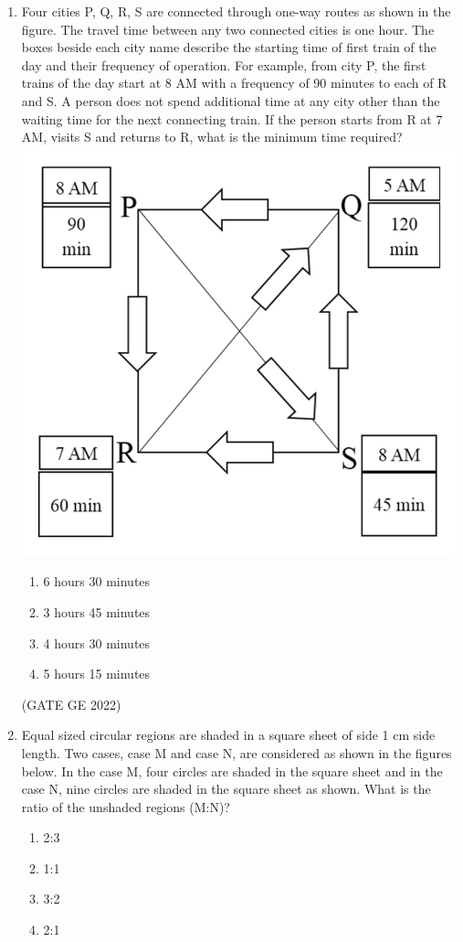 \documentclass[a4paper, 11pt]{article}
\begin{document}
\begin{enumerate}
\item Four cities P, Q, R, S are connected through one-way routes as shown in the figure. The travel time between any two connected cities is one hour. The boxes beside each city name describe the starting time of first train of the day and their frequency of operation. For example, from city P, the first trains of the day start at 8 AM with a frequency of 90 minutes to each of R and S. A person does not spend additional time at any city other than the waiting time for the next connecting train.
If the person starts from R at 7 AM, visits S and returns to R, what is the minimum time required?
\centering \includegraphics[width=\columnwidth]{figs/fig_9.png}
\begin{enumerate}
    \item 6 hours 30 minutes
    \item 3 hours 45 minutes
    \item 4 hours 30 minutes
    \item 5 hours 15 minutes
\end{enumerate}

\hfill (GATE GE 2022)

\item Equal sized circular regions are shaded in a square sheet of side 1 cm side length. Two cases, case M and case N, are considered as shown in the figures below. In the case M, four circles are shaded in the square sheet and in the case N, nine circles are shaded in the square sheet as shown.
What is the ratio of the unshaded regions (M:N)?
\begin{enumerate}
    \item 2:3
    \item 1:1
    \item 3:2
    \item 2:1
\end{enumerate}


\end{enumerate}
\end{document}
